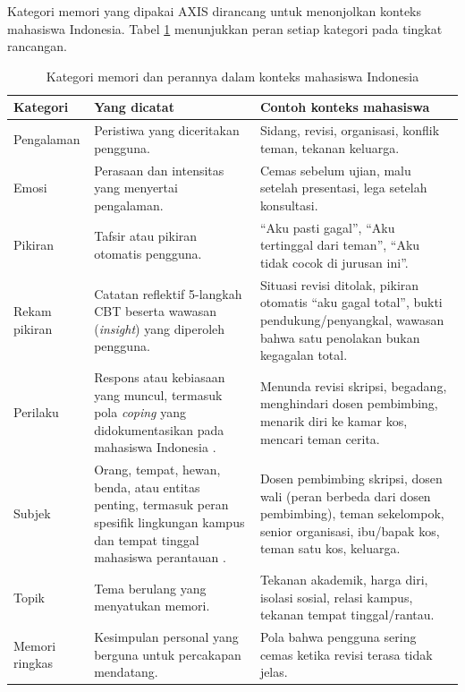 Kategori memori yang dipakai AXIS dirancang untuk menonjolkan konteks mahasiswa Indonesia. Tabel \ref{tab:kategori-memori} menunjukkan peran setiap kategori pada tingkat rancangan.

\begin{table}[!htbp]
\centering
\caption{Kategori memori dan perannya dalam konteks mahasiswa Indonesia}
\label{tab:kategori-memori}
{\footnotesize
\begin{tabularx}{\textwidth}{|>{\raggedright\arraybackslash}p{2.7cm}|>{\raggedright\arraybackslash}X|>{\raggedright\arraybackslash}X|}
\hline
\rowcolor{tableheadgray}
\textbf{Kategori} & \textbf{Yang dicatat} & \textbf{Contoh konteks mahasiswa} \\
\hline
Pengalaman & Peristiwa yang diceritakan pengguna. & Sidang, revisi, organisasi, konflik teman, tekanan keluarga. \\
\hline
Emosi & Perasaan dan intensitas yang menyertai pengalaman. & Cemas sebelum ujian, malu setelah presentasi, lega setelah konsultasi. \\
\hline
Pikiran & Tafsir atau pikiran otomatis pengguna. & ``Aku pasti gagal'', ``Aku tertinggal dari teman'', ``Aku tidak cocok di jurusan ini''. \\
\hline
Rekam pikiran & Catatan reflektif 5-langkah CBT beserta wawasan (\textit{insight}) yang diperoleh pengguna. & Situasi revisi ditolak, pikiran otomatis ``aku gagal total'', bukti pendukung/penyangkal, wawasan bahwa satu penolakan bukan kegagalan total. \\
\hline
Perilaku & Respons atau kebiasaan yang muncul, termasuk pola \textit{coping} yang didokumentasikan pada mahasiswa Indonesia \parencite{fernanda2025procrastination}. & Menunda revisi skripsi, begadang, menghindari dosen pembimbing, menarik diri ke kamar kos, mencari teman cerita. \\
\hline
Subjek & Orang, tempat, hewan, benda, atau entitas penting, termasuk peran spesifik lingkungan kampus dan tempat tinggal mahasiswa perantauan \parencite{sherlywati2022academicadvisor,putri2025boardinghouse}. & Dosen pembimbing skripsi, dosen wali (peran berbeda dari dosen pembimbing), teman sekelompok, senior organisasi, ibu/bapak kos, teman satu kos, keluarga. \\
\hline
Topik & Tema berulang yang menyatukan memori. & Tekanan akademik, harga diri, isolasi sosial, relasi kampus, tekanan tempat tinggal/rantau. \\
\hline
Memori ringkas & Kesimpulan personal yang berguna untuk percakapan mendatang. & Pola bahwa pengguna sering cemas ketika revisi terasa tidak jelas. \\
\hline
\end{tabularx}
}
\end{table}

